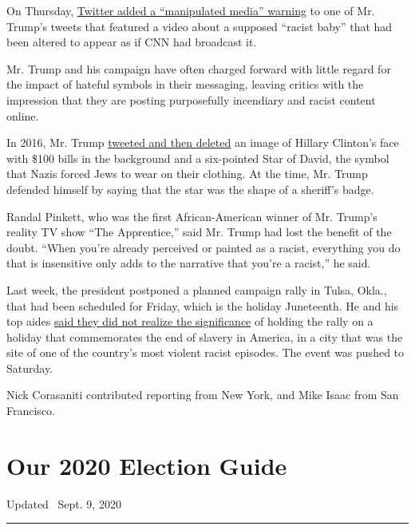 On Thursday,
\href{https://www.nytimes3xbfgragh.onion/2020/06/18/technology/trump-tweet-baby-manipulated.html}{Twitter
added a ``manipulated media'' warning} to one of Mr. Trump's tweets that
featured a video about a supposed ``racist baby'' that had been altered
to appear as if CNN had broadcast it.

Mr. Trump and his campaign have often charged forward with little regard
for the impact of hateful symbols in their messaging, leaving critics
with the impression that they are posting purposefully incendiary and
racist content online.

In 2016, Mr. Trump
\href{https://www.nytimes3xbfgragh.onion/2016/07/03/us/politics/trump-clinton-star-of-david.html}{tweeted
and then deleted} an image of Hillary Clinton's face with \$100 bills in
the background and a six-pointed Star of David, the symbol that Nazis
forced Jews to wear on their clothing. At the time, Mr. Trump defended
himself by saying that the star was the shape of a sheriff's badge.

Randal Pinkett, who was the first African-American winner of Mr. Trump's
reality TV show ``The Apprentice,'' said Mr. Trump had lost the benefit
of the doubt. ``When you're already perceived or painted as a racist,
everything you do that is insensitive only adds to the narrative that
you're a racist,'' he said.

Last week, the president postponed a planned campaign rally in Tulsa,
Okla., that had been scheduled for Friday, which is the holiday
Juneteenth. He and his top aides
\href{https://www.nytimes3xbfgragh.onion/2020/06/18/us/politics/trump-rally-tulsa-juneteenth.html}{said
they did not realize the significance} of holding the rally on a holiday
that commemorates the end of slavery in America, in a city that was the
site of one of the country's most violent racist episodes. The event was
pushed to Saturday.

Nick Corasaniti contributed reporting from New York, and Mike Isaac from
San Francisco.

\hypertarget{our-2020-election-guide}{%
\section{Our 2020 Election Guide}\label{our-2020-election-guide}}

Updated ~Sept. 9, 2020

\begin{center}\rule{0.5\linewidth}{\linethickness}\end{center}

